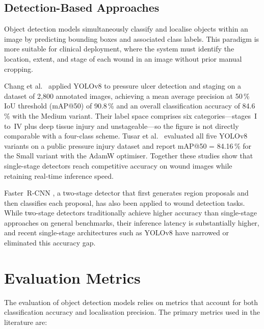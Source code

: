 \documentclass[a4paper,12pt,twoside]{report}
\begin{document}
\subsection{Detection-Based Approaches}

Object detection models simultaneously classify and localise objects within an
image by predicting bounding boxes and associated class labels. This paradigm
is more suitable for clinical deployment, where the system must identify the
location, extent, and stage of each wound in an image without prior manual
cropping.

Chang et al.\ \citep{chang2024diagnosis} applied YOLOv8 to pressure ulcer
detection and staging on a dataset of 2,800 annotated images, achieving a mean
average precision at 50\,\% IoU threshold (mAP@50) of 90.8\,\% and an overall
classification accuracy of 84.6\,\% with the Medium variant. Their label space
comprises six categories---stages~I to~IV plus deep tissue injury and
unstageable---so the figure is not directly comparable with a four-class scheme.
Tusar et al.\ \citep{tusar2026ai} evaluated all five YOLOv8 variants on a
public pressure injury dataset and report mAP@50 = 84.16\,\% for the Small
variant with the AdamW optimiser. Together these studies show that single-stage
detectors reach competitive accuracy on wound images while retaining real-time
inference speed.

Faster~R-CNN \citep{ren2015faster}, a two-stage detector that first generates
region proposals and then classifies each proposal, has also been applied to
wound detection tasks. While two-stage detectors traditionally achieve higher
accuracy than single-stage approaches on general benchmarks, their inference
latency is substantially higher, and recent single-stage architectures such as
YOLOv8 have narrowed or eliminated this accuracy gap.

\section{Evaluation Metrics}
\label{sec:eval-metrics}

The evaluation of object detection models relies on metrics that account for
both classification accuracy and localisation precision. The primary metrics
used in the literature are:
\end{document}
